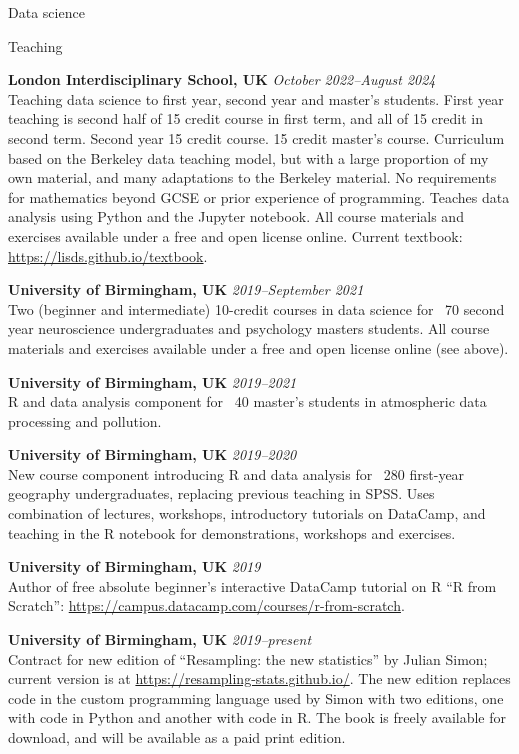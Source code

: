 \documentclass{cv}
\newcommand{\PlaceDateNote}[3]{{\bf #1} \hfill {\em #2} \\#3}
\newcommand{\LIS}{London Interdisciplinary School, UK}
\newcommand{\UoB}{University of Birmingham, UK}
\begin{document}
\begin{cvSection}{Data science}

\begin{cvSubSection}{Teaching}

\PlaceDateNote{\LIS}{October 2022--August 2024}
    {Teaching data science to  first year, second year and master's students.
    First year teaching is second half of 15 credit course in first term, and
    all of 15 credit in second term. Second year 15 credit course.  15 credit
    master's course. Curriculum based on the Berkeley data teaching model, but
    with a large proportion of my own material, and many adaptations to the
    Berkeley material.  No requirements for mathematics beyond GCSE or prior
    experience of programming.  Teaches data analysis using Python and the
    Jupyter notebook.  All course materials and exercises available under a
    free and open license online.  Current textbook:
    \url{https://lisds.github.io/textbook}.}

\PlaceDateNote{\UoB}{2019--September 2021}
    {Two (beginner and intermediate) 10-credit courses in data science for
    ~70 second year neuroscience undergraduates and psychology masters
    students. All course materials and exercises available under a free and
    open license online (see above).}

\PlaceDateNote{\UoB}{2019--2021}
    {R and data analysis component for ~40 master's students in atmospheric
    data processing and pollution}.

\PlaceDateNote{\UoB}{2019--2020}
    {New course component introducing R and
    data analysis for ~280 first-year geography undergraduates, replacing
    previous teaching in SPSS. Uses combination of lectures, workshops,
    introductory tutorials on DataCamp, and teaching in the R notebook for
    demonstrations, workshops and exercises.}

\PlaceDateNote{\UoB}{2019}
    {Author of free absolute beginner's interactive DataCamp tutorial on R ``R
    from Scratch'': \url{https://campus.datacamp.com/courses/r-from-scratch}.}

\PlaceDateNote{\UoB}{2019--present}
    {Contract for new edition of ``Resampling: the new statistics''
    by Julian Simon; current version is at
    \url{https://resampling-stats.github.io/}.  The new edition replaces
    code in the custom programming language used by Simon with two editions,
    one with code in Python and another with code in R.  The book is freely
    available for download, and will be available as a paid print edition}.


\end{cvSubSection}
\end{cvSection}
\end{document}
